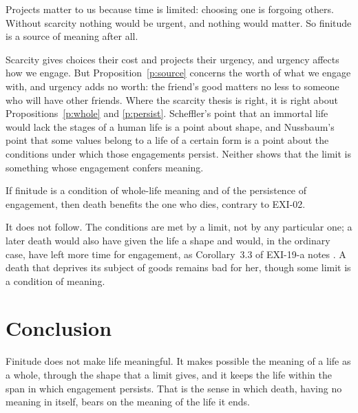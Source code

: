 \documentclass{situationist-preprint}
\begin{document}
\begin{objection}[Scarcity]
Projects matter to us because time is limited: choosing one is forgoing others. Without scarcity nothing would be urgent, and nothing would matter. So finitude is a source of meaning after all.
\end{objection}

\begin{reply}
Scarcity gives choices their cost and projects their urgency, and urgency affects how we engage. But Proposition~\ref{p:source} concerns the worth of what we engage with, and urgency adds no worth: the friend's good matters no less to someone who will have other friends. Where the scarcity thesis is right, it is right about Propositions~\ref{p:whole} and \ref{p:persist}. Scheffler's point that an immortal life would lack the stages of a human life is a point about shape, and Nussbaum's point that some values belong to a life of a certain form is a point about the conditions under which those engagements persist. Neither shows that the limit is something whose engagement confers meaning.
\end{reply}

\begin{objection}
If finitude is a condition of whole-life meaning and of the persistence of engagement, then death benefits the one who dies, contrary to EXI-02.
\end{objection}

\begin{reply}
It does not follow. The conditions are met by a limit, not by any particular one; a later death would also have given the life a shape and would, in the ordinary case, have left more time for engagement, as Corollary~3.3 of EXI-19-a notes \citep{Fischer1994}. A death that deprives its subject of goods remains bad for her, though some limit is a condition of meaning.
\end{reply}

\section{Conclusion}

Finitude does not make life meaningful. It makes possible the meaning of a life as a whole, through the shape that a limit gives, and it keeps the life within the span in which engagement persists. That is the sense in which death, having no meaning in itself, bears on the meaning of the life it ends.
\end{document}
